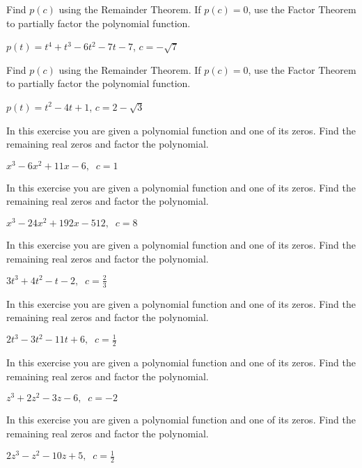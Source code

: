 \documentclass{ximera}
\begin{document}
\begin{problem}
Find $p(c)$ using the Remainder Theorem.  If $p(c) = 0$, use the Factor Theorem to partially factor the polynomial function.

$p(t) = t^4 +t^3-6t^2-7t-7$, $c=-\sqrt{7}$
\end{problem}

\begin{problem}\label{remainderexerlast}
Find $p(c)$ using the Remainder Theorem.  If $p(c) = 0$, use the Factor Theorem to partially factor the polynomial function.

$p(t) = t^2-4t+1$, $c =2-\sqrt{3}$ 
\end{problem}

\begin{problem}\label{factorpolyzerofirst}
In this exercise you are given a polynomial function and one of its zeros.  Find the remaining real zeros and factor the polynomial. 

$x^{3} - 6x^{2} + 11x - 6, \;\; c = 1$ 
\end{problem}

\begin{problem}
In this exercise you are given a polynomial function and one of its zeros.  Find the remaining real zeros and factor the polynomial. 

$x^{3} - 24x^{2} + 192x - 512, \;\; c = 8$
\end{problem}

\begin{problem}
In this exercise you are given a polynomial function and one of its zeros.  Find the remaining real zeros and factor the polynomial. 

$3t^{3} + 4t^{2} - t - 2, \;\; c = \frac{2}{3}$
\end{problem}

\begin{problem}
In this exercise you are given a polynomial function and one of its zeros.  Find the remaining real zeros and factor the polynomial. 

$2t^3-3t^2-11t+6, \;\; c=\frac{1}{2}$
\end{problem}

\begin{problem}
In this exercise you are given a polynomial function and one of its zeros.  Find the remaining real zeros and factor the polynomial. 

$z^3+2z^2-3z-6, \;\; c = -2$
\end{problem}

\begin{problem}
In this exercise you are given a polynomial function and one of its zeros.  Find the remaining real zeros and factor the polynomial. 

$2z^3-z^2-10z+5, \;\; c=\frac{1}{2}$
\end{problem}
\end{document}
